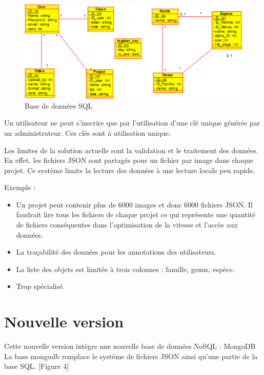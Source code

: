 \documentclass[12pt]{article}
\begin{document}
\begin{figure}[H]
\centering
\includegraphics[width=1\textwidth]{img/class_diagram_V1.png}
 \caption{Base de données SQL}
 \label{fig:BDD_SQL_V1}
\end{figure}

Un utilisateur ne peut s’inscrire que par l’utilisation d’une clé unique générée par un administrateur.
Ces clés sont à utilisation unique.

Les limites de la solution actuelle sont la validation et le traitement des données. En effet, les fichiers JSON sont partagés pour un fichier par image dans chaque projet. Ce système limite la lecture des données à une lecture locale peu rapide.
\par
Exemple :
\par
\begin{itemize}
    \item Un projet peut contenir plus de 6000 images et donc 6000 fichiers JSON. Il faudrait lire tous les fichiers de chaque projet ce qui représente une quantité de fichiers conséquentes dans l’optimisation de la vitesse et l’accès aux données.
    \item La traçabilité des données pour les annotations des utilisateurs.
    \item La liste des objets est limitée à trois colonnes : famille, genus, espèce.
    \item Trop spécialisé.
\end{itemize}


\section{Nouvelle version}
Cette nouvelle version intègre une nouvelle base de données NoSQL : MongoDB
La base mongodb remplace le système de fichiers JSON ainsi qu’une partie de la base SQL. [Figure 4]
\end{document}
